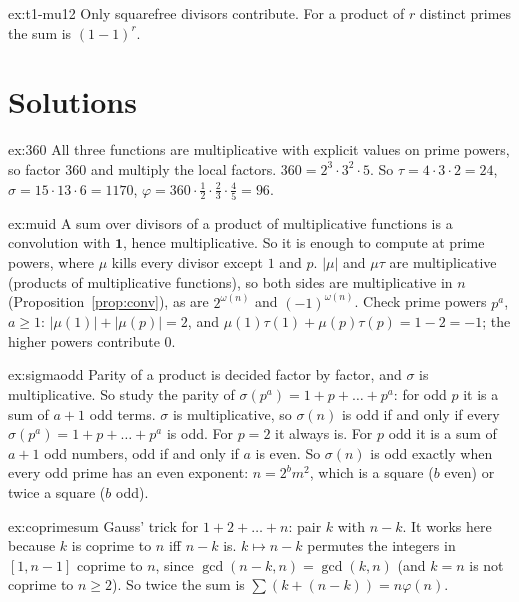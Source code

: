 \begin{hint}{ex:t1-mu12}
Only squarefree divisors contribute. For a product of $r$ distinct primes the sum is $(1-1)^r$.
\end{hint}

\section{Solutions}

\begin{solution}{ex:360}
\idea All three functions are multiplicative with explicit values on prime powers, so factor $360$ and multiply the local factors.
\writeup $360=2^3\cdot3^2\cdot5$. So $\tau=4\cdot3\cdot2=24$, $\sigma=15\cdot13\cdot6=1170$, $\varphi=360\cdot\frac12\cdot\frac23\cdot\frac45=96$.
\end{solution}

\begin{solution}{ex:muid}
\idea A sum over divisors of a product of multiplicative functions is a convolution with $\mathbf 1$, hence multiplicative. So it is enough to compute at prime powers, where $\mu$ kills every divisor except $1$ and $p$.
\writeup $|\mu|$ and $\mu\tau$ are multiplicative (products of multiplicative functions), so both sides are multiplicative in $n$ (Proposition~\ref{prop:conv}), as are $2^{\omega(n)}$ and $(-1)^{\omega(n)}$. Check prime powers $p^a$, $a\ge1$: $|\mu(1)|+|\mu(p)|=2$, and $\mu(1)\tau(1)+\mu(p)\tau(p)=1-2=-1$; the higher powers contribute $0$.
\end{solution}

\begin{solution}{ex:sigmaodd}
\idea Parity of a product is decided factor by factor, and $\sigma$ is multiplicative. So study the parity of $\sigma(p^a)=1+p+\dots+p^a$: for odd $p$ it is a sum of $a+1$ odd terms.
\writeup $\sigma$ is multiplicative, so $\sigma(n)$ is odd if and only if every $\sigma(p^a)=1+p+\dots+p^a$ is odd. For $p=2$ it always is. For $p$ odd it is a sum of $a+1$ odd numbers, odd if and only if $a$ is even. So $\sigma(n)$ is odd exactly when every odd prime has an even exponent: $n=2^bm^2$, which is a square ($b$ even) or twice a square ($b$ odd).
\end{solution}

\begin{solution}{ex:coprimesum}
\idea Gauss' trick for $1+2+\dots+n$: pair $k$ with $n-k$. It works here because $k$ is coprime to $n$ iff $n-k$ is.
\writeup $k\mapsto n-k$ permutes the integers in $[1,n-1]$ coprime to $n$, since $\gcd(n-k,n)=\gcd(k,n)$ (and $k=n$ is not coprime to $n\ge2$). So twice the sum is $\sum(k+(n-k))=n\varphi(n)$.
\end{solution}

